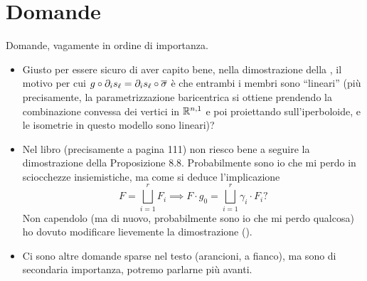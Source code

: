 \section*{Domande}
Domande, vagamente in ordine di importanza.
\begin{itemize}
\item Giusto per essere sicuro di aver capito bene, nella dimostrazione della , il motivo per cui $g\circ\partial_is_\ell=\partial_is_\ell\circ\overline{\sigma}$ è che entrambi i membri sono ``lineari'' (più precisamente, la parametrizzazione baricentrica si ottiene prendendo la combinazione convessa dei vertici in $\mathbb{R}^{n,1}$ e poi proiettando sull'iperboloide, e le isometrie in questo modello sono lineari)?
\item Nel libro (precisamente a pagina 111) non riesco bene a seguire la dimostrazione della Proposizione 8.8. Probabilmente sono io che mi perdo in sciocchezze insiemistiche, ma come si deduce l'implicazione
\[
F=\bigsqcup_{i=1}^r F_i\implies F\cdot g_0=\bigsqcup_{i=1}^r \gamma_i\cdot F_i?
\]
Non capendolo (ma di nuovo, probabilmente sono io che mi perdo qualcosa) ho dovuto modificare lievemente la dimostrazione ().
\item Ci sono altre domande sparse nel testo (arancioni, a fianco), ma sono di secondaria importanza, potremo parlarne più avanti.
\end{itemize}
